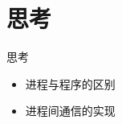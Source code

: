 

\section{思考}
\begin{frame}{思考}
\begin{itemize}
\item 进程与程序的区别
\item 进程间通信的实现
\end{itemize}
\end{frame}



